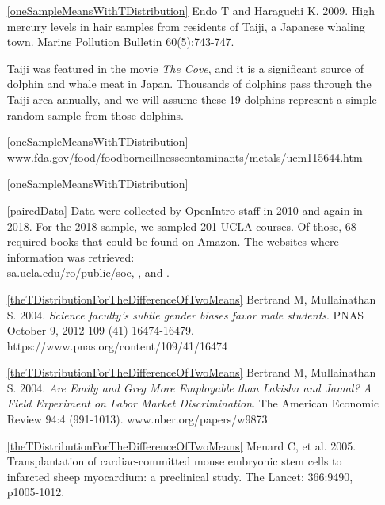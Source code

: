 \begin{itemize}
\item[\ref{oneSampleMeansWithTDistribution}]
    Endo T and Haraguchi K. 2009.
    High mercury levels in hair samples from residents of Taiji,
    a Japanese whaling town.
    Marine Pollution Bulletin 60(5):743-747.

    Taiji was featured in the movie
    \emph{The Cove}, and it is a significant source of dolphin
    and whale meat in Japan.
    Thousands of dolphins pass through the Taiji area annually,
    and we will assume these 19 dolphins represent a simple
    random sample from those dolphins.
\item[\ref{oneSampleMeansWithTDistribution}]
        {www.fda.gov/food/foodborneillnesscontaminants/metals/ucm115644.htm}
\item[\ref{oneSampleMeansWithTDistribution}]

\item[\ref{pairedData}]
    Data were collected by OpenIntro staff in 2010 and again
    in 2018.
    For the 2018 sample, we sampled 201 UCLA courses.
    Of those, 68 required books that could be
    found on Amazon.
    The websites where information was retrieved: \\
        {sa.ucla.edu/ro/public/soc},
    ,
    and .

\item[\ref{theTDistributionForTheDifferenceOfTwoMeans}]
    Bertrand M, Mullainathan S. 2004.
    \emph{Science faculty's subtle gender biases favor male students}.
    PNAS October 9, 2012 109 (41) 16474-16479.\\
        {https://www.pnas.org/content/109/41/16474}


\item[\ref{theTDistributionForTheDifferenceOfTwoMeans}]
    Bertrand M, Mullainathan S. 2004.
    \emph{Are Emily and Greg More Employable than Lakisha and Jamal?
    A Field Experiment on Labor Market Discrimination}.
    The American Economic Review 94:4 (991-1013).
        {www.nber.org/papers/w9873}

\item[\ref{theTDistributionForTheDifferenceOfTwoMeans}]
        {Menard C, et al. 2005.
            Transplantation of cardiac-committed mouse embryonic
            stem cells to infarcted sheep myocardium:
            a preclinical study.
            The Lancet: 366:9490, p1005-1012.}


\end{itemize}
